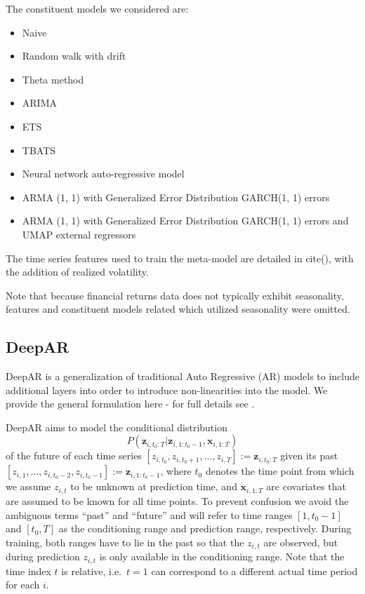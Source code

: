 \documentclass{article}
\newcommand{\z}[2]{z_{#1, #2}}
\newcommand{\zVec}[3]{\mathbf{z}_{#1, #2:#3}}
\newcommand{\xVec}[3]{\mathbf{x}_{#1, #2:#3}}
\begin{document}
The constituent models we considered are:
\begin{itemize}
	\item Naive
	\item Random walk with drift
	\item Theta method
	\item ARIMA
	\item ETS
	\item TBATS
	\item Neural network auto-regressive model
	\item ARMA (1, 1) with Generalized Error Distribution GARCH(1, 1) errors
	\item ARMA (1, 1) with Generalized Error Distribution GARCH(1, 1) errors and UMAP external regressors
\end{itemize}

The time series features used to train the meta-model are detailed in cite(), with the addition of realized volatility.

Note that because financial returns data does not typically exhibit seasonality, features and constituent models related which utilized seasonality were omitted.

\FloatBarrier
\subsection{DeepAR}
DeepAR is a generalization of traditional Auto Regressive (AR) models to include additional layers into order to introduce non-linearities into the model. We provide the general formulation here - for full details see \cite{salinas_deepar_2019}.


DeepAR aims to model the conditional distribution 
\begin{equation*}
P(\zVec{i}{t_0}{T} | \zVec{i}{1}{t_0-1}, \xVec{i}{1}{T})
\label{eq:condDist}
\end{equation*} 
of the future of each time series $[\z{i}{t_0}, \z{i}{t_0 + 1}, \ldots, \z{i}{T}] := \zVec{i}{t_0}{T}$ given its \hbox{past $[\z{i}{1}, \ldots, \z{i}{t_0-2}, \z{i}{t_0-1}] := \zVec{i}{1}{t_0-1}$}, where $t_0$ denotes the time point from which we assume $\z{i}{t}$ to be unknown at prediction time, and $\xVec{i}{1}{T}$ are covariates that are assumed to be known for all time points. To prevent
confusion we avoid the ambiguous terms ``past'' and ``future'' and will refer to time ranges $[1, t_0-1]$ and $[t_0, T]$ as the conditioning range and 
prediction range, respectively. During training, both ranges have to lie in the past so that the $\z{i}{t}$ are observed, but during prediction $\z{i}{t}$
is only available in the conditioning range. Note that the time index $t$ is relative, i.e.\ $t=1$ can correspond to a different actual
time period for each $i$. 
\end{document}
